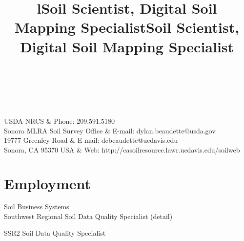 \documentclass[overlapped,line,10pt,letterpaper]{res}
\begin{document}



\begin{resume}

\begin{format}
\\
\title{l}\\
\end{format}

\begin{ncolumn}{2}
  USDA-NRCS    						& Phone: 209.591.5180\\
  Sonora MLRA Soil Survey Office    & E-mail: dylan.beaudette@usda.gov\\
  19777 Greenley Road				& E-mail: debeaudette@ucdavis.edu\\
  Sonora, CA 95370   USA   			& Web: \small{http://casoilresource.lawr.ucdavis.edu/soilweb}
\end{ncolumn}

\section{\bf Employment}

\title{Soil Scientist, Digital Soil Mapping Specialist}
\begin{position}
\begin{minipage}{0.95\textwidth}
Soil Business Systems\\
Southwest Regional Soil Data Quality Specialist (detail)
\end{minipage}
\end{position}

\title{Soil Scientist, Digital Soil Mapping Specialist}
\begin{position}
\begin{minipage}{0.95\textwidth}
SSR2 Soil Data Quality Specialist
\end{minipage}
\end{position}


\end{resume}
\end{document}
